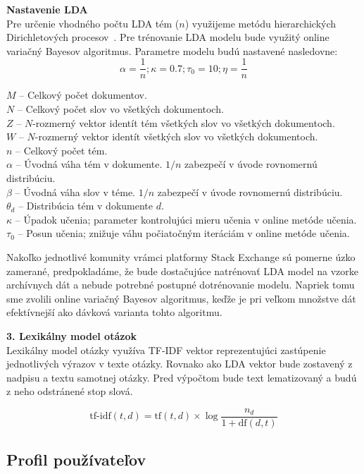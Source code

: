 \begin{adjustwidth}{1cm}{1cm}
\textbf{Nastavenie LDA}\\
\label{design:lda-setup}
Pre určenie vhodného počtu LDA tém ($n$) využijeme metódu hierarchických Dirichletových procesov~\cite{Teh2006}.
Pre trénovanie LDA modelu bude využitý online variačný Bayesov algoritmus. Parametre modelu budú nastavené nasledovne:\\
$$\alpha = \frac{1}{n}; \kappa = 0.7; \tau_0 = 10; \eta = \frac{1}{n}$$

$M$ -- Celkový počet dokumentov. \\
$N$ -- Celkový počet slov vo všetkých dokumentoch. \\
$Z$ -- $N$-rozmerný vektor identít tém všetkých slov vo všetkých dokumentoch. \\
$W$ -- $N$-rozmerný vektor identít všetkých slov vo všetkých dokumentoch. \\
$n$ -- Celkový počet tém. \\
$\alpha$   -- Úvodná váha tém v dokumente. $1/n$ zabezpečí v úvode rovnomernú distribúciu.\\
$\beta$    -- Úvodná váha slov v téme. $1/n$ zabezpečí v úvode rovnomernú distribúciu.\\
$\theta_d$ -- Distribúcia tém v dokumente $d$. \\
$\kappa$   -- Úpadok učenia; parameter kontrolujúci mieru učenia v online metóde učenia. \\
$\tau_0$   -- Posun učenia; znižuje váhu počiatočným iteráciám v online metóde učenia.

Nakoľko jednotlivé komunity vrámci platformy Stack Exchange sú pomerne úzko zamerané, predpokladáme, že bude dostačujúce
natrénovať LDA model na vzorke archívnych dát a nebude potrebné postupné dotrénovanie modelu. Napriek tomu sme zvolili
online variačný Bayesov algoritmus, keďže je pri veľkom množstve dát efektívnejší ako dávková varianta tohto algoritmu.
\end{adjustwidth}

\textbf{3. Lexikálny model otázok}\\
Lexikálny model otázky využíva TF-IDF vektor reprezentujúci zastúpenie jednotlivých výrazov v texte otázky. Rovnako ako
LDA vektor bude zostavený z nadpisu a textu samotnej otázky. Pred výpočtom bude text lematizovaný a budú z neho odstránené
stop slová.

$$\textrm{tf-idf}(t, d) = \textrm{tf}(t, d) \times \log\frac{n_d}{1+\textrm{df}(d, t)}$$

\subsection{Profil používateľov}

